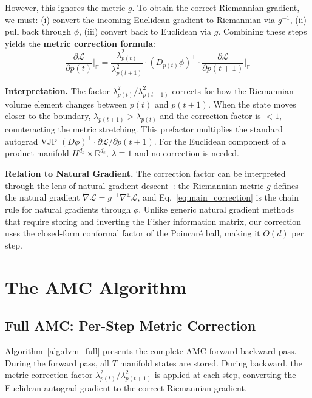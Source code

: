 \documentclass[a4paper,fleqn]{cas-dc}
\begin{document}
However, this ignores the metric $g$. To obtain the correct Riemannian gradient, we must: (i) convert the incoming Euclidean gradient to Riemannian via $g^{-1}$, (ii) pull back through $\phi$, (iii) convert back to Euclidean via $g$. Combining these steps yields the \textbf{metric correction formula}:
\begin{equation}
\boxed{\frac{\partial\mathcal{L}}{\partial p(t)}\bigg|_{\mathbb{E}}
 = \frac{\lambda_{p(t)}^2}{\lambda_{p(t+1)}^2}
   \cdot (D_{p(t)}\phi)^\top \cdot
   \frac{\partial\mathcal{L}}{\partial p(t+1)}\bigg|_{\mathbb{E}}}
\label{eq:main_correction}
\end{equation}

\textbf{Interpretation.} The factor $\lambda_{p(t)}^2 / \lambda_{p(t+1)}^2$ corrects for how the Riemannian volume element changes between $p(t)$ and $p(t+1)$. When the state moves closer to the boundary, $\lambda_{p(t+1)} > \lambda_{p(t)}$ and the correction factor is $<1$, counteracting the metric stretching. This prefactor multiplies the standard autograd VJP $(D\phi)^\top \cdot \partial\mathcal{L}/\partial p(t+1)$. For the Euclidean component of a product manifold $H^{d_h} \times \mathbb{R}^{d_e}$, $\lambda \equiv 1$ and no correction is needed.

\textbf{Relation to Natural Gradient.} The correction factor can be interpreted through the lens of natural gradient descent~\citep{Amari98}: the Riemannian metric $g$ defines the natural gradient $\tilde{\nabla}\mathcal{L} = g^{-1}\nabla^{\mathbb{E}}\mathcal{L}$, and Eq.~\eqref{eq:main_correction} is the chain rule for natural gradients through $\phi$. Unlike generic natural gradient methods that require storing and inverting the Fisher information matrix, our correction uses the closed-form conformal factor of the Poincar\'e ball, making it $O(d)$ per step.

\section{The AMC Algorithm}
\label{sec:method}

\subsection{Full AMC: Per-Step Metric Correction}

Algorithm~\ref{alg:dvm_full} presents the complete AMC forward-backward pass. During the forward pass, all $T$ manifold states are stored. During backward, the metric correction factor $\lambda_{p(t)}^2 / \lambda_{p(t+1)}^2$ is applied at each step, converting the Euclidean autograd gradient to the correct Riemannian gradient.
\end{document}
